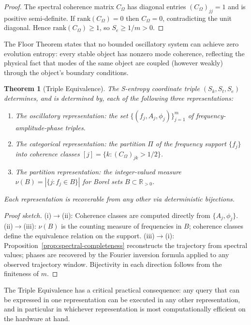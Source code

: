 \documentclass[10pt,twocolumn]{article}
\newtheorem{theorem}{Theorem}[section]
\newcommand{\R}{\mathbb{R}}
\begin{document}
\begin{proof}
The spectral coherence matrix $C_\Omega$ has diagonal entries $(C_\Omega)_{jj} = 1$
and is positive semi-definite. If $\text{rank}(C_\Omega) = 0$ then
$C_\Omega = 0$, contradicting the unit diagonal. Hence
$\text{rank}(C_\Omega) \geq 1$, so $S_e \geq 1/m > 0$.
\end{proof}

The Floor Theorem states that no bounded oscillatory system can achieve
zero evolution entropy: every stable object has nonzero mode coherence,
reflecting the physical fact that modes of the same object are coupled
(however weakly) through the object's boundary conditions.

\begin{theorem}[Triple Equivalence]
\label{thm:triple-equiv}
The S-entropy coordinate triple $(S_k, S_t, S_e)$ determines, and is
determined by, each of the following three representations:
\begin{enumerate}[label=(\roman*)]
\item The \emph{oscillatory representation}: the set
      $\{(f_j, A_j, \phi_j)\}_{j=1}^m$ of frequency-amplitude-phase triples.
\item The \emph{categorical representation}: the partition $\Pi$ of the
      frequency support $\{f_j\}$ into coherence classes
      $[j] = \{k : (C_\Omega)_{jk} > 1/2\}$.
\item The \emph{partition representation}: the integer-valued measure
      $\nu(B) = |\{j : f_j \in B\}|$ for Borel sets $B \subset \R_{>0}$.
\end{enumerate}
Each representation is recoverable from any other via deterministic bijections.
\end{theorem}

\begin{proof}[Proof sketch]
(i)$\to$(ii): Coherence classes are computed directly from $\{A_j, \phi_j\}$.
(ii)$\to$(iii): $\nu(B)$ is the counting measure of frequencies in $B$;
coherence classes define the equivalence relation on the support.
(iii)$\to$(i): Proposition~\ref{prop:spectral-completeness} reconstructs
the trajectory from spectral values; phases are recovered by
the Fourier inversion formula applied to any observed trajectory window.
Bijectivity in each direction follows from the finiteness of $m$.
\end{proof}

The Triple Equivalence has a critical practical consequence:
any query that can be expressed in one representation can be executed
in any other representation, and in particular in whichever representation
is most computationally efficient on the hardware at hand.
\end{document}
